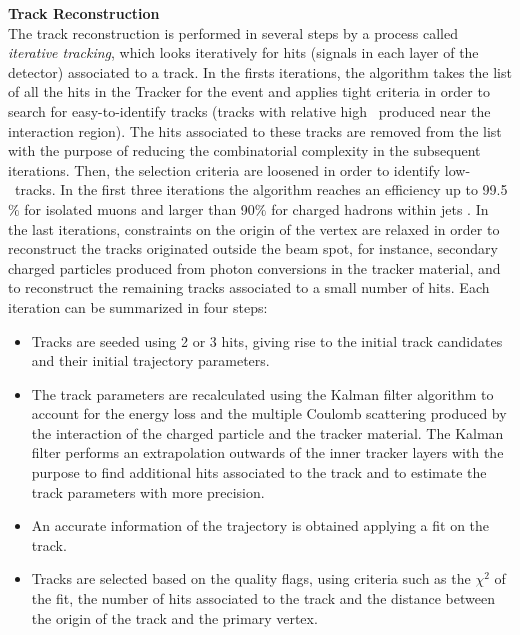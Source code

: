 \textbf{Track Reconstruction}\\

\noindent The track reconstruction is performed in several steps by a process called \textit{iterative tracking}, which
looks iteratively for hits (signals in each layer of the detector) associated to a track. In the firsts iterations, 
the algorithm takes the list of all the hits in the Tracker for the event and applies tight criteria 
in order to search for easy-to-identify tracks (tracks with relative high \pt~produced near the interaction region). The
hits associated to these tracks are removed from the list with the purpose of reducing the 
combinatorial complexity in the subsequent iterations. Then, the selection criteria are loosened 
in order to identify low-\pt~tracks. In the first three iterations the algorithm reaches an 
efficiency up to 99.5$\%$ for isolated muons and larger than 90$\%$ for 
charged hadrons within jets \cite{PFAlgorithm}. In the last iterations, constraints on the origin of the vertex
are relaxed in order to reconstruct the tracks originated outside the beam spot, for instance, secondary 
charged particles produced from photon conversions in the tracker material, and to reconstruct the remaining 
tracks associated to a small number of hits. Each iteration can be summarized in four steps:\\

\begin{itemize}
 \item Tracks are seeded using 2 or 3 hits, giving rise to the initial track candidates and their initial trajectory parameters.
 \item The track parameters are recalculated using the Kalman filter algorithm \cite{KalmanAlgorithm} to 
       account for the energy loss and the multiple Coulomb scattering produced by the interaction of the 
       charged particle and the tracker material. The Kalman filter performs an extrapolation outwards of 
       the inner tracker layers with the purpose to find additional hits associated to the track 
       and to estimate the track parameters with more precision.
 \item An accurate information of the trajectory is obtained applying a fit on the track.
 \item Tracks are selected based on the quality flags, using criteria such as the $\chi^{2}$ of the fit, the number of 
       hits associated to the track and the distance between the origin of the track and the primary vertex.
\end{itemize}

